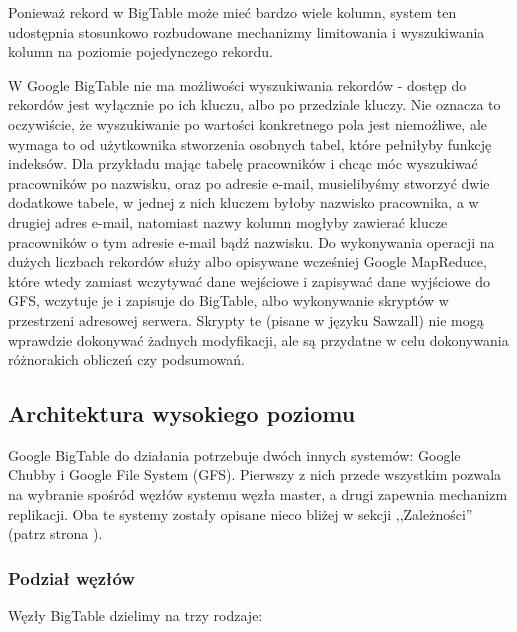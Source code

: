 Ponieważ rekord w BigTable może mieć bardzo wiele kolumn, system ten udostępnia stosunkowo rozbudowane mechanizmy limitowania i wyszukiwania kolumn na poziomie pojedynczego rekordu.

W Google BigTable nie ma możliwości wyszukiwania rekordów - dostęp do rekordów jest wyłącznie po ich kluczu, albo po przedziale kluczy.
Nie oznacza to oczywiście, że wyszukiwanie po wartości konkretnego pola jest niemożliwe, ale wymaga to od użytkownika stworzenia osobnych tabel, które pełniłyby funkcję indeksów.
Dla przykładu mając tabelę pracowników i chcąc móc wyszukiwać pracowników po nazwisku, oraz po adresie e-mail, musielibyśmy stworzyć dwie dodatkowe tabele, w jednej z nich kluczem byłoby nazwisko pracownika, a w drugiej adres e-mail, natomiast nazwy kolumn mogłyby zawierać klucze pracowników o tym adresie e-mail bądź nazwisku.
Do wykonywania operacji na dużych liczbach rekordów służy albo opisywane wcześniej Google MapReduce, które wtedy zamiast wczytywać dane wejściowe i zapisywać dane wyjściowe do GFS, wczytuje je i zapisuje do BigTable, albo wykonywanie skryptów w przestrzeni adresowej serwera.
Skrypty te (pisane w języku Sawzall) nie mogą wprawdzie dokonywać żadnych modyfikacji, ale są przydatne w celu dokonywania różnorakich obliczeń czy podsumowań.

\subsection*{Architektura wysokiego poziomu}

Google BigTable do działania potrzebuje dwóch innych systemów: Google Chubby i Google File System (GFS).
Pierwszy z nich przede wszystkim pozwala na wybranie spośród węzłów systemu węzła master, a drugi zapewnia mechanizm replikacji.
Oba te systemy zostały opisane nieco bliżej w sekcji ,,Zależności'' (patrz strona \pageref{sec:bigtable-zaleznosci}).

\subsubsection*{Podział węzłów}


Węzły BigTable dzielimy na trzy rodzaje:

